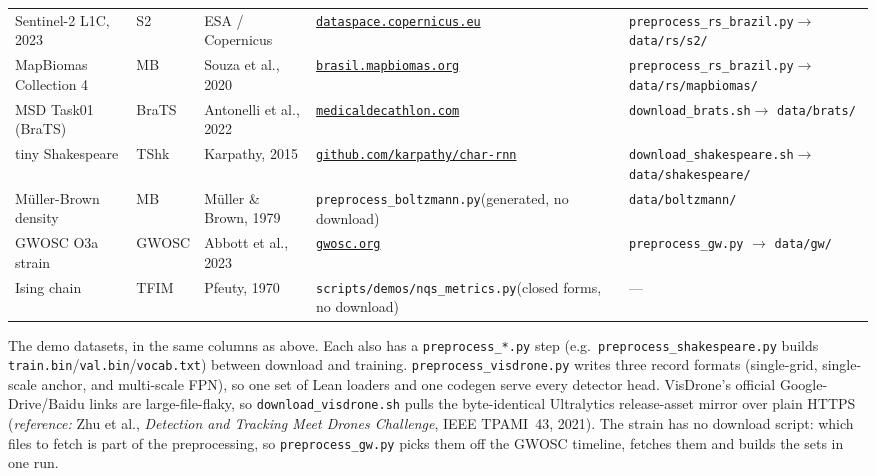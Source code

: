 \begin{center}
\begin{tabular}{@{}l l p{3.2cm} p{4.0cm} p{3.7cm}@{}}
Sentinel-2 L1C, 2023 & S2 & ESA / Copernicus &
  \href{https://dataspace.copernicus.eu/}{\nolinkurl{dataspace.copernicus.eu}} &
  \texttt{preprocess\_rs\_brazil.py}\newline $\to$ \texttt{data/rs/s2/}  \\[2pt]
MapBiomas Collection 4 & MB & Souza et al., 2020 &
  \href{https://brasil.mapbiomas.org/}{\nolinkurl{brasil.mapbiomas.org}} &
  \texttt{preprocess\_rs\_brazil.py}\newline $\to$ \texttt{data/rs/mapbiomas/}  \\[2pt]
MSD Task01 (BraTS) & BraTS & Antonelli et al., 2022 &
  \href{http://medicaldecathlon.com/}{\nolinkurl{medicaldecathlon.com}} &
  \texttt{download\_brats.sh}\newline $\to$ \texttt{data/brats/}  \\[2pt]
tiny Shakespeare & TShk & Karpathy, 2015 &
  \href{https://github.com/karpathy/char-rnn}{\nolinkurl{github.com/karpathy/char-rnn}} &
  \texttt{download\_shakespeare.sh}\newline $\to$ \texttt{data/shakespeare/}  \\[2pt]
M\"uller-Brown density & MB & M\"uller \& Brown, 1979 &
  \texttt{preprocess\_boltzmann.py}\newline (generated, no download) &
  \texttt{data/boltzmann/}  \\[2pt]
GWOSC O3a strain & GWOSC & Abbott et al., 2023 &
  \href{https://gwosc.org/}{\nolinkurl{gwosc.org}} &
  \texttt{preprocess\_gw.py} $\to$ \texttt{data/gw/}  \\[2pt]
Ising chain & TFIM & Pfeuty, 1970 &
  \texttt{scripts/demos/\allowbreak nqs\_metrics.py}\newline (closed forms, no download) &
  ---  \\
\hline
\end{tabular}
\end{center}

\noindent\small The demo datasets, in the same columns as above. Each
also has a \texttt{preprocess\_*.py} step (e.g.\
\texttt{preprocess\_shakespeare.py} builds
\texttt{train.bin}/\texttt{val.bin}/\texttt{vocab.txt}) between download
and training. \texttt{preprocess\_visdrone.py} writes three
record formats (single-grid, single-scale anchor, and multi-scale FPN), so
one set of Lean loaders and one codegen serve every detector head.
VisDrone's official Google-Drive/Baidu links are large-file-flaky, so
\texttt{download\_visdrone.sh} pulls the byte-identical Ultralytics
release-asset mirror over plain HTTPS (\emph{reference:} Zhu et al.,
\emph{Detection and Tracking Meet Drones Challenge}, IEEE TPAMI~43, 2021).
The strain has no download script: which files to fetch is part of the
preprocessing, so \texttt{preprocess\_gw.py} picks them off the GWOSC
timeline, fetches them and builds the sets in one run.
\normalsize


